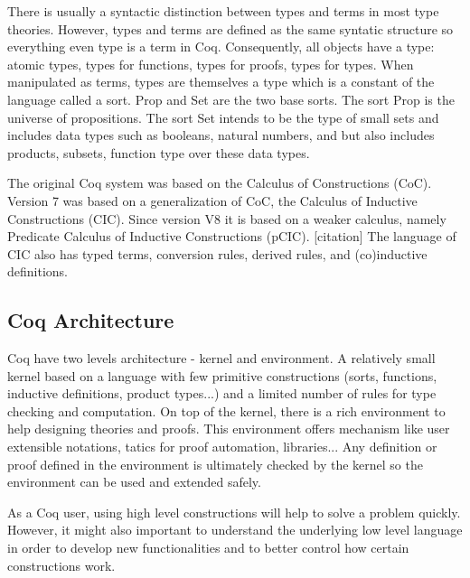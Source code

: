 There is usually a syntactic distinction between types and terms in
most type theories. However, types and terms are defined as the same
syntatic structure so everything even type is a term in
Coq. Consequently, all objects have a type:  atomic types, types for
functions, types for proofs, types for types. When manipulated as
terms, types are themselves a type which is a constant of the language
called a sort. Prop and Set are the two base sorts. The sort Prop is
the universe of propositions. The sort Set intends to be the type of
small sets and includes data types such as booleans, natural numbers,
and but also includes products, subsets, function type over these data
types.

The original Coq system was based on the Calculus of Constructions
(CoC). %
Version 7 was based on a generalization of CoC, the Calculus of Inductive
Constructions (CIC). %
Since version V8 it is based on a weaker calculus, namely Predicate
Calculus of Inductive Constructions (pCIC). %
[citation] 
The language of CIC also has typed terms, conversion rules,
derived rules, and (co)inductive definitions.

\subsection{Coq Architecture}
Coq have two levels architecture - kernel and environment. A relatively small kernel based on a language with few primitive constructions (sorts, functions, inductive definitions, product types...) and a limited number of rules for type checking and computation. On top of the kernel, there is a rich environment to help designing theories and proofs. This environment offers mechanism like user extensible notations, tatics for proof automation, libraries... Any definition or proof defined in the environment is ultimately checked by the kernel so the environment can be used and extended safely.

As a Coq user, using high level constructions will help to solve a problem quickly. However, it might also important to understand the underlying low level language in order to develop new functionalities and to better control how certain constructions work. 
 







